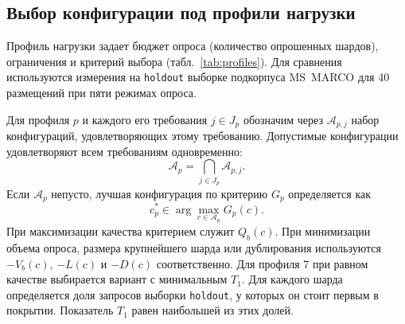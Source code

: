 \documentclass[10pt, a4paper, twoside]{article}
\newcommand{\strategy}[1]{\texttt{#1}}
\begin{document}
\begin{ntvbody}

\subsection{Выбор конфигурации под профили нагрузки}
Профиль нагрузки задает бюджет опроса (количество опрошенных шардов), ограничения и критерий выбора (табл.~\ref{tab:profiles}).
Для сравнения используются измерения на \strategy{holdout} выборке подкорпуса MS~MARCO для 40 размещений при пяти режимах опроса.

Для профиля $p$ и каждого его требования $j\in J_p$ обозначим через $\mathcal A_{p,j}$ набор конфигураций, удовлетворяющих этому требованию.
Допустимые конфигурации удовлетворяют всем требованиям одновременно:
\begin{equation}
 \mathcal A_p=\bigcap_{j\in J_p}\mathcal A_{p,j}.
 \label{eq:profile-feasible}
\end{equation}
Если $\mathcal A_p$ непусто, лучшая конфигурация по критерию $G_p$ определяется как
\begin{equation}
 c_p^*\in\arg\max_{c\in\mathcal A_p} G_p(c).
 \label{eq:profile-choice}
\end{equation}
При максимизации качества критерием служит $Q_b(c)$.
При минимизации объема опроса, размера крупнейшего шарда или дублирования используются $-V_b(c)$, $-L(c)$ и $-D(c)$ соответственно.
Для профиля 7 при равном качестве выбирается вариант с минимальным $T_1$.
Для каждого шарда определяется доля запросов выборки \strategy{holdout}, у которых он стоит первым в покрытии.
Показатель $T_1$ равен наибольшей из этих долей.

\end{ntvbody}
\end{document}
